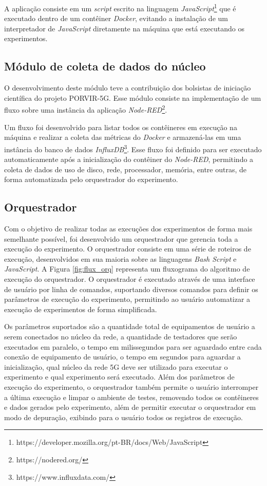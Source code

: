 A aplicação consiste em um \textit{script} escrito na linguagem \textit{JavaScript}\footnote{https://developer.mozilla.org/pt-BR/docs/Web/JavaScript} que é executado dentro de um contêiner \textit{Docker}, evitando a instalação de um interpretador de \textit{JavaScript} diretamente na máquina que está executando os experimentos.

\subsection{Módulo de coleta de dados do núcleo}

O desenvolvimento deste módulo teve a contribuição dos bolsistas de iniciação científica do projeto PORVIR-5G.
Esse módulo consiste na implementação de um fluxo sobre uma instância da aplicação \textit{Node-RED}\footnote{https://nodered.org/}.

Um fluxo foi desenvolvido para listar todos os contêineres em execução na máquina e realizar a coleta das métricas do \textit{Docker} e armazená-las em uma instância do banco de dados \textit{InfluxDB}\footnote{https://www.influxdata.com/}. Esse fluxo foi definido para ser executado automaticamente após a inicialização do contêiner do \textit{Node-RED}, permitindo a coleta de dados de uso de disco, rede, processador, memória, entre outras, de forma automatizada pelo orquestrador do experimento.

\subsection{Orquestrador}
\label{sub:arch-orchestrator}

Com o objetivo de realizar todas as execuções dos experimentos de forma mais semelhante possível, foi desenvolvido um orquestrador que gerencia toda a execução do experimento.
O orquestrador consiste em uma série de roteiros de execução, desenvolvidos em sua maioria sobre as linguagens \textit{Bash Script} e \textit{JavaScript}.
A Figura \ref{fig:flux_orq} representa um fluxograma do algoritmo de execução do orquestrador.
O orquestrador é executado através de uma interface de usuário por linha de comandos, suportando diversos comandos para definir os parâmetros de execução do experimento, permitindo ao usuário automatizar a execução de experimentos de forma simplificada.

Os parâmetros suportados são a quantidade total de equipamentos de usuário a serem conectados no núcleo da rede, a quantidade de testadores que serão executados em paralelo, o tempo em milissegundos para ser aguardado entre cada conexão de equipamento de usuário, o tempo em segundos para aguardar a inicialização, qual núcleo da rede 5G deve ser utilizado para executar o experimento e qual experimento será executado.
Além dos parâmetros de execução do experimento, o orquestrador também permite o usuário interromper a última execução e limpar o ambiente de testes, removendo todos os contêineres e dados gerados pelo experimento, além de permitir executar o orquestrador em modo de depuração, exibindo para o usuário todos os registros de execução.

